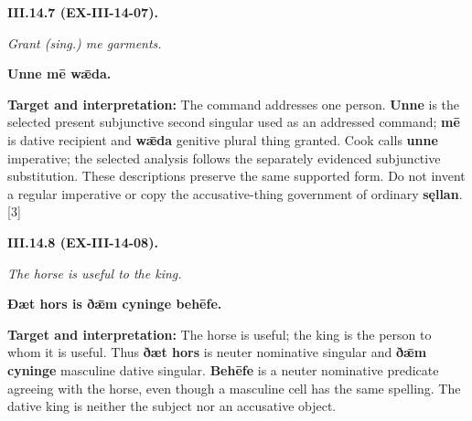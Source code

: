 \par\begin{minipage}{\linewidth}\raggedright
\textbf{III.14.7 (EX-III-14-07).}

\emph{Grant (sing.) me garments.}

\textbf{Unne mē wǣda.}

\textbf{Target and interpretation:} The command addresses one person. \textbf{Unne} is the selected present subjunctive second singular used as an addressed command; \textbf{mē} is dative recipient and \textbf{wǣda} genitive plural thing granted. Cook calls \textbf{unne} imperative; the selected analysis follows the separately evidenced subjunctive substitution. These descriptions preserve the same supported form. Do not invent a regular imperative or copy the accusative-thing government of ordinary \textbf{sęllan}. [3]

\end{minipage}\par\addvspace{4pt}

\par\begin{minipage}{\linewidth}\raggedright
\textbf{III.14.8 (EX-III-14-08).}

\emph{The horse is useful to the king.}

\textbf{Ðæt hors is ðǣm cyninge behēfe.}

\textbf{Target and interpretation:} The horse is useful; the king is the person to whom it is useful. Thus \textbf{ðæt hors} is neuter nominative singular and \textbf{ðǣm cyninge} masculine dative singular. \textbf{Behēfe} is a neuter nominative predicate agreeing with the horse, even though a masculine cell has the same spelling. The dative king is neither the subject nor an accusative object.

\end{minipage}\par\addvspace{4pt}

